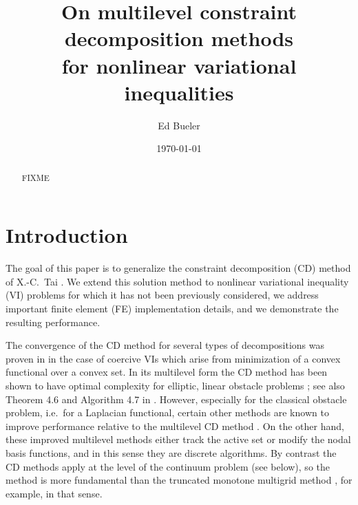 \documentclass[letterpaper,final,12pt,reqno]{amsart}
\theoremstyle{cstyle}
\theoremstyle{dstyle}
\numberwithin{equation}{section}
\numberwithin{figure}{section}
\numberwithin{table}{section}
\numberwithin{theorem}{section}
\begin{document}
\title[On MCD methods for nonlinear and nonlocal VIs]{On multilevel constraint decomposition methods \\ for nonlinear variational inequalities}

\author{Ed Bueler}

\date{\today}

\begin{abstract} FIXME
\end{abstract}

\maketitle


\thispagestyle{empty}

\section{Introduction} \label{sec:intro}

The goal of this paper is to generalize the constraint decomposition (CD) method of X.-C.~Tai \cite{Tai2003}.  We extend this solution method to nonlinear variational inequality (VI) problems for which it has not been previously considered, we address important finite element (FE) implementation details, and we demonstrate the resulting performance.

The convergence of the CD method for several types of decompositions was proven in \cite{Tai2003} in the case of coercive VIs which arise from minimization of a convex functional over a convex set.  In its multilevel form the CD method has been shown to have optimal complexity for elliptic, linear obstacle problems \cite[subsection 5.4]{Tai2003}; see also Theorem 4.6 and Algorithm 4.7 in \cite{GraeserKornhuber2009}.  However, especially for the classical obstacle problem, i.e.~for a Laplacian functional, certain other methods are known to improve performance relative to the multilevel CD method \cite{GraeserKornhuber2009}.  On the other hand, these improved multilevel methods either track the active set or modify the nodal basis functions, and in this sense they are discrete algorithms.  By contrast the CD methods apply at the level of the continuum problem (see below), so the method is more fundamental than the truncated monotone multigrid method \cite{GraeserKornhuber2009,Kornhuber1994}, for example, in that sense.
\end{document}
